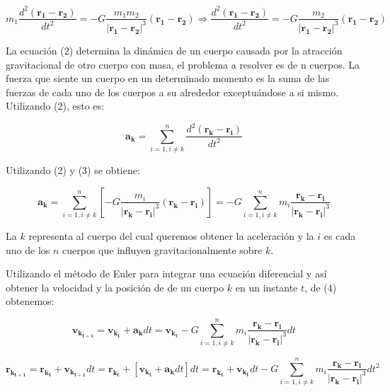 \documentclass[12pt,letterpaper]{article}
\begin{document}
\begin{equation}
 m_1\dfrac{d ^2 \mathbf{(r_1-r_2)}}{d t^2}=-G\dfrac{m_1m_2}{|\mathbf{r_{1}}-\mathbf{r_2}|^3}(\mathbf{r_{1}}-\mathbf{r_2}) \Rightarrow \dfrac{d ^2 \mathbf{(r_1-r_2)}}{d t^2}=-G\dfrac{m_2}{|\mathbf{r_{1}}-\mathbf{r_2}|^3}(\mathbf{r_{1}}-\mathbf{r_2})
\end{equation} 

La ecuación (2) determina la dinámica de un cuerpo causada por la atracción gravitacional de otro cuerpo con masa, el problema a resolver es de n cuerpos. La fuerza que siente un cuerpo en un determinado momento es la suma de las fuerzas de cada uno de los cuerpos a su alrededor exceptuándose a si mismo. Utilizando (2), esto es:

\begin{equation}
 \mathbf{a_{k}}=\sum_{i=1 , i \neq k}^{n} \dfrac{d ^2 \mathbf{(r_k-r_i)}}{d t^2}
\end{equation}

Utilizando (2) y (3) se obtiene:

\begin{equation}
  \mathbf{a_k}=\sum_{i=1 , i \neq k}^{n}[ -G\dfrac{m_i}{|\mathbf{r_{k}}-\mathbf{r_i}|^3}(\mathbf{r_{k}}-\mathbf{r_i})]=-G \sum_{i=1 , i \neq k}^{n} m_ i\dfrac{\mathbf{r_{k}}-\mathbf{r_i}}{|\mathbf{r_{k}}-\mathbf{r_i}|^3}
\end{equation}

La $k$ representa al cuerpo del cual queremos obtener la aceleración y la $i$ es cada uno de los $n$ cuerpos que influyen gravitacionalmente sobre $k$.

Utilizando el método de Euler para integrar una ecuación diferencial y así obtener la velocidad y la posición de de un cuerpo $k$ en un instante $t$, de (4) obtenemos:

\begin{equation}
 \mathbf{v_{k_{t+1}}} =  \mathbf{v_{k_t}} + \mathbf{a_k} dt = \mathbf{v_{k_t}} - G \sum_{i=1 , i \neq k}^{n} m_ i\dfrac{\mathbf{r_{k}}-\mathbf{r_i}}{|\mathbf{r_{k}}-\mathbf{r_i}|^3} dt
\end{equation}

\begin{equation}
 \mathbf{r_{k_{t+1}}} =  \mathbf{r_{k_t}} +  \mathbf{v_{k_{t+1}}} dt = \mathbf{r_{k_t}} + [\mathbf{v_{k_t}} + \mathbf{a_k} dt] dt = \mathbf{r_{k_t}} + \mathbf{v_{k_t}} dt - G \sum_{i=1 , i \neq k}^{n} m_ i\dfrac{\mathbf{r_{k}}-\mathbf{r_i}}{|\mathbf{r_{k}}-\mathbf{r_i}|^3} dt ^ 2
\end{equation}
\end{document}
